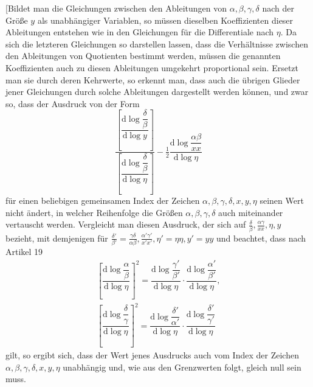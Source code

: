 \begingroup
\renewcommand{\arraystretch}{1.45}

[Bildet man die Gleichungen zwischen den Ableitungen von $\alpha,\allowbreak \beta,\allowbreak \gamma,\allowbreak \delta$ nach der Größe $y$ als unabhängiger Variablen, so müssen dieselben Koeffizienten dieser Ableitungen entstehen wie in den Gleichungen für die Differentiale nach $\eta$. Da sich die letzteren Gleichungen so darstellen lassen, dass die Verhältnisse zwischen den Ableitungen von Quotienten bestimmt werden, müssen die genannten Koeffizienten auch zu diesen Ableitungen umgekehrt proportional sein. Ersetzt man sie durch deren Kehrwerte, so erkennt man, dass auch die übrigen Glieder jener Gleichungen durch solche Ableitungen dargestellt werden können, und zwar so, dass der Ausdruck von der Form
\[
\dfrac{\left[\dfrac{\mathrm{d}\log\dfrac{\delta}{\beta}}{\mathrm{d}\log y}\right]}
{\left[\dfrac{\mathrm{d}\log\dfrac{\delta}{\beta}}{\mathrm{d}\log\eta}\right]}
-\tfrac12\dfrac{\mathrm{d}\log\dfrac{\alpha\beta}{xx}}{\mathrm{d}\log\eta}
\]
für einen beliebigen gemeinsamen Index der Zeichen $\alpha,\allowbreak \beta,\allowbreak \gamma,\allowbreak \delta,\allowbreak x,\allowbreak y,\allowbreak \eta$ seinen Wert nicht ändert, in welcher Reihenfolge die Größen $\alpha,\allowbreak \beta,\allowbreak \gamma,\allowbreak \delta$ auch miteinander vertauscht werden. Vergleicht man diesen Ausdruck, der sich auf $\frac{\delta}{\beta},\allowbreak \frac{\alpha\gamma}{xx},\allowbreak \eta,\allowbreak y$ bezieht, mit demjenigen für $\frac{\delta'}{\beta'}=\frac{\gamma\delta}{\alpha\beta},\allowbreak \frac{\alpha'\gamma'}{x'x'},\allowbreak \eta'=\eta\eta,\allowbreak y'=yy$ und beachtet, dass nach Artikel 19
\[
\begin{gathered}\left[\dfrac{\mathrm{d}\log\dfrac{\alpha}{\beta}}{\mathrm{d}\log\eta}\right]^2
=\dfrac{\mathrm{d}\log\dfrac{\gamma'}{\beta'}}{\mathrm{d}\log\eta}\cdot
\dfrac{\mathrm{d}\log\dfrac{\alpha'}{\beta'}}{\mathrm{d}\log\eta},\\[9pt]
\left[\dfrac{\mathrm{d}\log\dfrac{\delta}{\gamma}}{\mathrm{d}\log\eta}\right]^2
=\dfrac{\mathrm{d}\log\dfrac{\delta'}{\alpha'}}{\mathrm{d}\log\eta}\cdot
\dfrac{\mathrm{d}\log\dfrac{\delta'}{\gamma'}}{\mathrm{d}\log\eta}\end{gathered}
\]
gilt, so ergibt sich, dass der Wert jenes Ausdrucks auch vom Index der Zeichen $\alpha,\allowbreak \beta,\allowbreak \gamma,\allowbreak \delta,\allowbreak x,\allowbreak y,\allowbreak \eta$ unabhängig und, wie aus den Grenzwerten folgt, gleich null sein muss.

